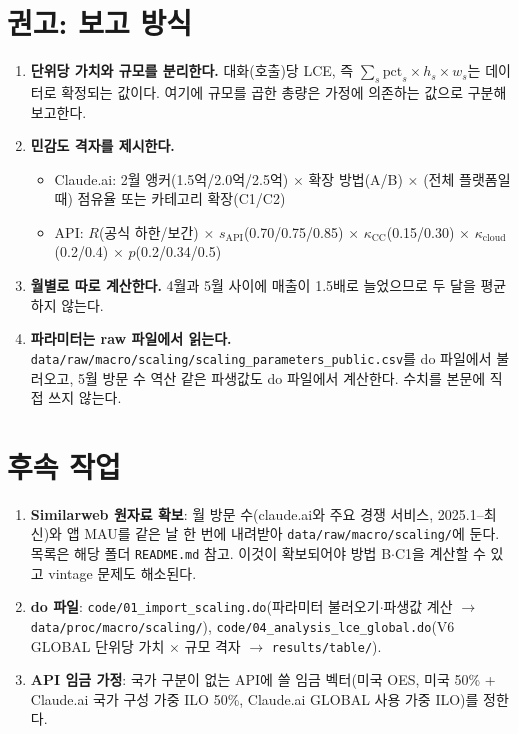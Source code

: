\documentclass[11pt]{article}
\begin{document}
\section{권고: 보고 방식}

\begin{enumerate}[label=(\arabic*)]
  \item \textbf{단위당 가치와 규모를 분리한다.} 대화(호출)당 LCE, 즉 $\sum_s \text{pct}_s \times h_s \times w_s$는 데이터로 확정되는 값이다. 여기에 규모를 곱한 총량은 가정에 의존하는 값으로 구분해 보고한다.
  \item \textbf{민감도 격자를 제시한다.}
  \begin{itemize}
    \item Claude.ai: 2월 앵커(1.5억/2.0억/2.5억) $\times$ 확장 방법(A/B) $\times$ (전체 플랫폼일 때) 점유율 또는 카테고리 확장(C1/C2)
    \item API: $R$(공식 하한/보간) $\times$ $s_{\text{API}}$(0.70/0.75/0.85) $\times$ $\kappa_{\text{CC}}$(0.15/0.30) $\times$ $\kappa_{\text{cloud}}$(0.2/0.4) $\times$ $p$(0.2/0.34/0.5)
  \end{itemize}
  \item \textbf{월별로 따로 계산한다.} 4월과 5월 사이에 매출이 1.5배로 늘었으므로 두 달을 평균하지 않는다.
  \item \textbf{파라미터는 raw 파일에서 읽는다.} \texttt{data/raw/macro/scaling/scaling\_parameters\_public.csv}를 do 파일에서 불러오고, 5월 방문 수 역산 같은 파생값도 do 파일에서 계산한다. 수치를 본문에 직접 쓰지 않는다.
\end{enumerate}

\section{후속 작업}

\begin{enumerate}[label=(\arabic*)]
  \item \textbf{Similarweb 원자료 확보}: 월 방문 수(claude.ai와 주요 경쟁 서비스, 2025.1--최신)와 앱 MAU를 같은 날 한 번에 내려받아 \texttt{data/raw/macro/scaling/}에 둔다. 목록은 해당 폴더 \texttt{README.md} 참고. 이것이 확보되어야 방법 B$\cdot$C1을 계산할 수 있고 vintage 문제도 해소된다.
  \item \textbf{do 파일}: \texttt{code/01\_import\_scaling.do}(파라미터 불러오기$\cdot$파생값 계산 $\to$ \texttt{data/proc/macro/scaling/}), \texttt{code/04\_analysis\_lce\_global.do}(V6 GLOBAL 단위당 가치 $\times$ 규모 격자 $\to$ \texttt{results/table/}).
  \item \textbf{API 임금 가정}: 국가 구분이 없는 API에 쓸 임금 벡터(미국 OES, 미국 50\% + Claude.ai 국가 구성 가중 ILO 50\%, Claude.ai GLOBAL 사용 가중 ILO)를 정한다.
\end{enumerate}
\end{document}

